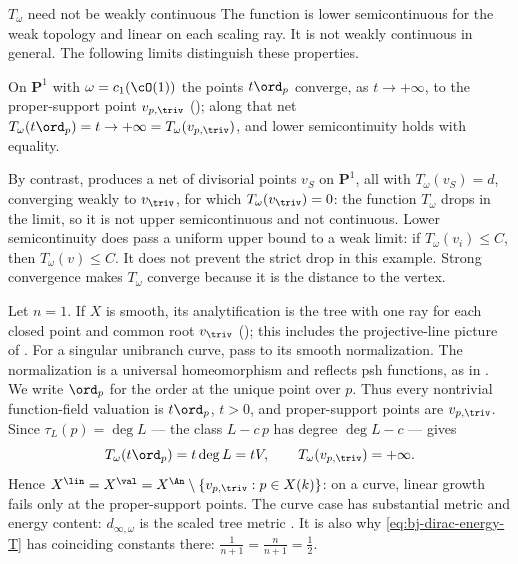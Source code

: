 \begin{warning}{$T_\omega$ need not be weakly continuous}
\label{warn:ch49-T-not-continuous}
The function is lower semicontinuous for the weak topology and
linear on each scaling ray.  It is not weakly continuous in general.
The following limits distinguish these properties.

On $\mathbf P^1$ with $\omega=c_1(\cO(1))$ the points $t\ord_p$
converge, as $t\to+\infty$, to the proper-support point $v_{p,\triv}$
(); along that net
$T_\omega(t\ord_p)=t\to+\infty=T_\omega(v_{p,\triv})$, and lower
semicontinuity holds with equality.

By contrast,  produces a net of divisorial
points $v_S$ on $\mathbf P^1$, all with $T_\omega(v_S)=d$, converging
weakly to $v_{\triv}$, for which $T_\omega(v_{\triv})=0$: the function
$T_\omega$ drops in the limit, so it is not upper semicontinuous and not
continuous.  Lower semicontinuity does pass a uniform upper bound to a weak limit:
if $T_\omega(v_i)\le C$, then $T_\omega(v)\le C$.  It does not prevent
the strict drop in this example.  Strong convergence makes
$T_\omega$ converge because it is the distance to the vertex.
\end{warning}

\begin{example}
\label{ex:ch49-curve-case}
Let $n=1$.  If $X$ is smooth, its analytification is the tree with
one ray for each closed point and common root $v_{\triv}$
(\cite[\S1.1.6]{BJ22}); this includes the projective-line picture
of .  For a singular unibranch
curve, pass to its smooth normalization.  The normalization is a
universal homeomorphism and reflects psh functions, as in
.
We write $\ord_p$ for the order at the unique point over $p$.
Thus every nontrivial function-field valuation is $t\ord_p$,
$t>0$, and proper-support points are $v_{p,\triv}$.
Since
$\tau_L(p)=\deg L$ --- the class $L-c\,p$ has degree
$\deg L-c$ ---  gives
\[
 T_\omega(t\ord_p)=t\deg L=tV,
 \qquad
 T_\omega(v_{p,\triv})=+\infty .
\]
Hence $X^{\lin}=X^{\val}=X^{\An}\setminus\{v_{p,\triv}:p\in X(k)\}$: on a
curve, linear growth fails only at the proper-support points.  The curve case has substantial metric and energy content:
$d_{\infty,\omega}$ is the scaled tree metric
\cite[Example~11.8]{BJ22}.  It is also why \eqref{eq:bj-dirac-energy-T} has coinciding constants
there: $\tfrac1{n+1}=\tfrac n{n+1}=\tfrac12$.
\end{example}

